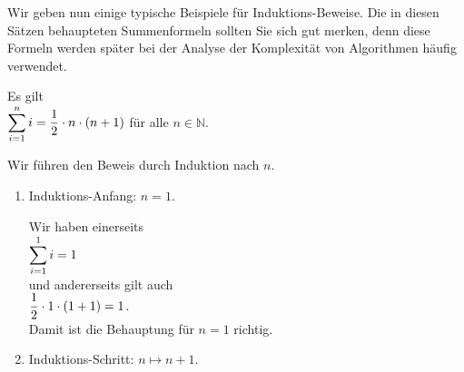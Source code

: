Wir geben nun einige typische Beispiele f\"{u}r Induktions-Beweise.  Die in diesen S\"{a}tzen behaupteten
Summenformeln sollten Sie sich gut merken, denn diese Formeln werden sp\"{a}ter bei der Analyse der Komplexit\"{a}t
von Algorithmen h\"{a}ufig verwendet.

\begin{Satz} Es gilt 
\\[0.2cm]
\hspace*{1.3cm}
$\displaystyle\sum\limits_{i=1}^n i = \frac{1}{2} \cdot n \cdot (n+1)$ \quad f\"{u}r alle $n \in \mathbb{N}$.
\end{Satz}

\proof
Wir f\"{u}hren den Beweis durch Induktion nach $n$.
\begin{enumerate}
\item Induktions-Anfang: $n=1$.

      Wir haben einerseits
      \\[0.2cm]
      \hspace*{1.3cm}
      $\displaystyle\sum\limits_{i=1}^1 i = 1$
      \\[0.2cm]
      und andererseits gilt auch
      \\[0.2cm]
      \hspace*{1.3cm}
      $\displaystyle\frac{1}{2} \cdot 1 \cdot (1+1) = 1$.
      \\[0.2cm]
      Damit ist die Behauptung f\"{u}r $n=1$ richtig.
\item Induktions-Schritt: $n \mapsto n+1$.


\end{enumerate}
